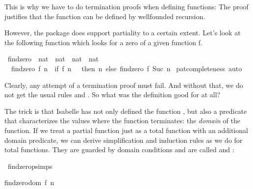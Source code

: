 \begin{isabellebody}
\begin{isamarkuptext}
  This is why we have to do termination
  proofs when defining functions: The proof justifies that the
  function can be defined by wellfounded recursion.

  However, the  package does support partiality to a
  certain extent. Let's look at the following function which looks
  for a zero of a given function f.%
\end{isamarkuptext}%
\isamarkuptrue%
\isamarkupfalse%
\ findzero\ {\isacharcolon}{\isacharcolon}\ {\isachardoublequoteopen}{\isacharparenleft}nat\ {\isasymRightarrow}\ nat{\isacharparenright}\ {\isasymRightarrow}\ nat\ {\isasymRightarrow}\ nat{\isachardoublequoteclose}\isanewline
{}\isanewline
\ \ {\isachardoublequoteopen}findzero\ f\ n\ {\isacharequal}\ {\isacharparenleft}if\ f\ n\ {\isacharequal}\ {}\ then\ n\ else\ findzero\ f\ {\isacharparenleft}Suc\ n{\isacharparenright}{\isacharparenright}{\isachardoublequoteclose}\isanewline
%
\isadelimproof
%
\endisadelimproof
%
\isatagproof
{}\isamarkupfalse%
\ pat{\isacharunderscore}completeness\ auto%
\endisatagproof
{\isafoldproof}%
%
\isadelimproof
%
\endisadelimproof
%
\begin{isamarkuptext}%
Clearly, any attempt of a termination proof must fail. And without
  that, we do not get the usual rules  and 
  . So what was the definition good for at all?%
\end{isamarkuptext}%
\isamarkuptrue%
%
\isamarkuptrue%
%
\begin{isamarkuptext}%
The trick is that Isabelle has not only defined the function , but also
  a predicate  that characterizes the values where the function
  terminates: the \emph{domain} of the function. If we treat a
  partial function just as a total function with an additional domain
  predicate, we can derive simplification and
  induction rules as we do for total functions. They are guarded
  by domain conditions and are called  and :%
\end{isamarkuptext}%
\isamarkuptrue%
\isamarkupfalse%
\ findzero{\isachardot}psimps%
\begin{isamarkuptext}%
\begin{isabelle}%
findzero{\isacharunderscore}dom\ {\isacharparenleft}{\isacharquery}f{\isacharcomma}\ {\isacharquery}n{\isacharparenright}\ {\isasymLongrightarrow}\isanewline

\end{isabelle}
\end{isamarkuptext}
\end{isabellebody}

